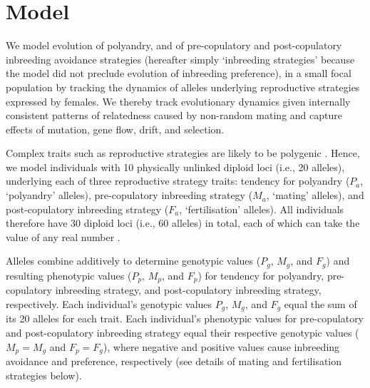 \documentclass[10pt,letterpaper]{article}
\begin{document}
\section*{Model}

We model evolution of polyandry, and of pre-copulatory and post-copulatory inbreeding avoidance strategies (hereafter simply `inbreeding strategies' because the model did not preclude evolution of inbreeding preference), in a small focal population by tracking the dynamics of alleles underlying reproductive strategies expressed by females. We thereby track evolutionary dynamics given internally consistent patterns of relatedness caused by non-random mating and capture effects of mutation, gene flow, drift, and selection. 

Complex traits such as reproductive strategies are likely to be polygenic \cite[][]{Evans2008}. Hence, we model individuals with 10 physically unlinked diploid loci (i.e., 20 alleles), underlying each of three reproductive strategy traits: tendency for polyandry ($P_{a}$, `polyandry' alleles), pre-copulatory inbreeding strategy ($M_{a}$, `mating' alleles), and post-copulatory inbreeding strategy ($F_{a}$, `fertilisation' alleles). All individuals therefore have 30 diploid loci (i.e., 60 alleles) in total, each of which can take the value of any real number \cite[continuum-of-alleles model;][]{Kimura1965, Lande1976, Reeve2000, Bocedi2014}.

Alleles combine additively to determine genotypic values ($P_{g}$, $M_{g}$, and $F_{g}$) and resulting phenotypic values ($P_{p}$, $M_{p}$, and $F_{p}$) for tendency for polyandry, pre-copulatory inbreeding strategy, and post-copulatory inbreeding strategy, respectively. Each individual's genotypic values $P_{g}$, $M_{g}$, and $F_{g}$ equal the sum of its 20 alleles for each trait. Each individual's phenotypic values for pre-copulatory and post-copulatory inbreeding strategy equal their respective genotypic values ($M_{p} = M_{g}$ and $F_{p} = F_{g}$), where negative and positive values cause inbreeding avoidance and preference, respectively (see details of mating and fertilisation strategies below). 
\end{document}
